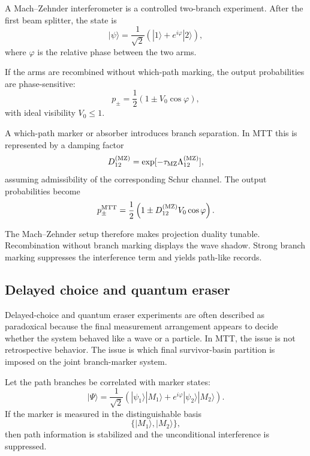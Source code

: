 \documentclass[11pt]{article}
\begin{document}
A Mach--Zehnder interferometer is a controlled two-branch experiment. After the first beam
splitter, the state is
\begin{equation}
  |\psi\rangle
  =
  \frac{1}{\sqrt2}
  \left(
  |1\rangle+e^{i\varphi}|2\rangle
  \right),
  \label{eq:mz-state}
\end{equation}
where \(\varphi\) is the relative phase between the two arms.

If the arms are recombined without which-path marking, the output probabilities are
phase-sensitive:
\begin{equation}
  p_\pm
  =
  \frac12(1\pm V_0\cos\varphi),
  \label{eq:mz-ideal}
\end{equation}
with ideal visibility \(V_0\le1\).

A which-path marker or absorber introduces branch separation. In MTT this is represented by
a damping factor
\begin{equation}
  D_{12}^{(\rm MZ)}
  =
  \exp[-\tau_{\rm MZ}\Lambda_{12}^{(\rm MZ)}],
\end{equation}
assuming admissibility of the corresponding Schur channel. The output probabilities become
\begin{equation}
  p_\pm^{\rm MTT}
  =
  \frac12
  \left(
  1\pm D_{12}^{(\rm MZ)}V_0\cos\varphi
  \right).
  \label{eq:mz-mtt}
\end{equation}

The Mach--Zehnder setup therefore makes projection duality tunable. Recombination without
branch marking displays the wave shadow. Strong branch marking suppresses the interference
term and yields path-like records.

\subsection{Delayed choice and quantum eraser}
\label{subsec:delayed-choice-module}

Delayed-choice and quantum eraser experiments are often described as paradoxical because
the final measurement arrangement appears to decide whether the system behaved like a wave
or a particle. In MTT, the issue is not retrospective behavior. The issue is which final
survivor-basin partition is imposed on the joint branch-marker system.

Let the path branches be correlated with marker states:
\begin{equation}
  |\Psi\rangle
  =
  \frac{1}{\sqrt2}
  \left(
  |\psi_1\rangle|M_1\rangle
  +
  e^{i\varphi}|\psi_2\rangle|M_2\rangle
  \right).
  \label{eq:eraser-joint-state}
\end{equation}
If the marker is measured in the distinguishable basis
\begin{equation}
  \{|M_1\rangle,|M_2\rangle\},
\end{equation}
then path information is stabilized and the unconditional interference is suppressed.
\end{document}
